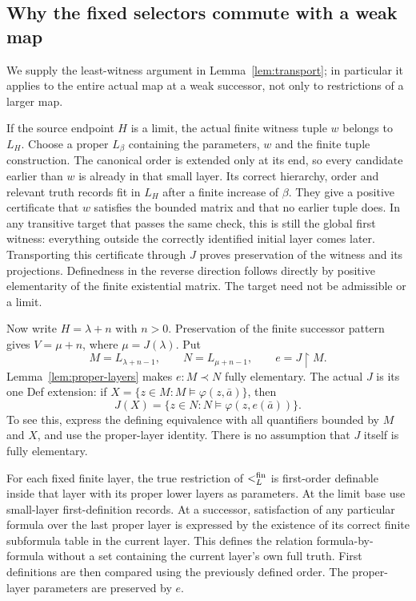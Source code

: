 \subsection{Why the fixed selectors commute with a weak map}
\label{sec:fixed-description}
We supply the least-witness argument in Lemma~\ref{lem:transport}; in
particular it applies to the entire actual map at a weak successor,
not only to restrictions of a larger map.

If the source endpoint $H$ is a limit, the actual finite witness tuple
$w$ belongs to $L_H$. Choose a proper $L_\beta$ containing the parameters,
$w$ and the finite tuple construction. The canonical order is extended
only at its end, so every candidate earlier than $w$ is already in that
small layer. Its correct hierarchy, order and relevant truth records
fit in $L_H$ after a finite increase of $\beta$. They give a positive
certificate that $w$ satisfies the bounded matrix and that no earlier
tuple does. In any transitive target that passes the same check, this
is still the global first witness: everything outside the correctly
identified initial layer comes later. Transporting this certificate
through $J$ proves preservation of the witness and its projections.
Definedness in the reverse direction follows directly by positive
elementarity of the finite existential matrix. The target need not be
admissible or a limit.

Now write $H=\lambda+n$ with $n>0$. Preservation of the finite
successor pattern gives $V=\mu+n$, where $\mu=J(\lambda)$. Put
\[
 M=L_{\lambda+n-1},\qquad N=L_{\mu+n-1},\qquad e=J\restriction M.
\]
Lemma~\ref{lem:proper-layers} makes $e:M\prec N$ fully elementary.
The actual $J$ is its one Def extension: if
$X=\{z\in M:M\models\varphi(z,\bar a)\}$, then
\begin{equation}\label{eq:4-4}
 J(X)=\{z\in N:N\models\varphi(z,e(\bar a))\}.       
\end{equation}
To see this, express the defining equivalence with all quantifiers
bounded by $M$ and $X$, and use the proper-layer identity. There is no
assumption that $J$ itself is fully elementary.

For each fixed finite layer, the true restriction of $<_L^{\rm fin}$
is first-order definable inside that layer with its proper lower layers
as parameters. At the limit base use small-layer first-definition
records. At a successor, satisfaction of any particular formula over
the last proper layer is expressed by the existence of its correct finite
subformula table in the current layer. This defines the relation
formula-by-formula without a set containing the current layer's own
full truth. First definitions are then compared using the previously
defined order. The proper-layer parameters are preserved by $e$.

